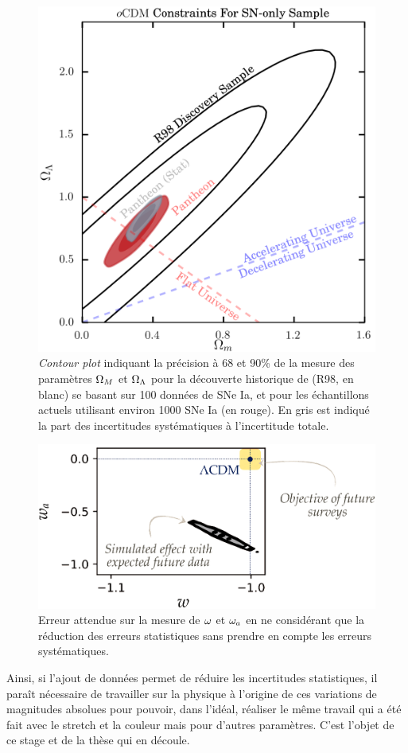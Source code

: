 \documentclass[a4paper, 12pt, svgnames]{article}
\begin{document}
\begin{figure}[htbp!]
    \centering
    \includegraphics[width=.5\linewidth]{Rapport_figures/scolnic_syst.png}
    \captionsetup{justification=centering}
    \caption{\textit{Contour plot} indiquant la précision à 68 et 90\% de la
    mesure des paramètres $\Omega_M$ et $\Omega_\Lambda$ pour la découverte historique de
     (R98, en blanc) se basant sur 100 données de SNe Ia, et
    pour les échantillons actuels utilisant environ 1000 SNe Ia (en rouge). En
    gris est indiqué la part des incertitudes systématiques à l'incertitude
    totale. \cite{scolnic_complete_2018}}
    \label{scolnic_syst}
\end{figure}

\begin{figure}[htbp!]
    \centering
    \includegraphics[width=.5\linewidth]{Rapport_figures/error.PNG}
    \captionsetup{justification=centering}
    \caption{Erreur attendue sur la mesure de $\omega$ et $\omega_a$ en ne considérant
    que la réduction des erreurs statistiques sans prendre en compte les erreurs
    systématiques.}
    \label{err_syst}
\end{figure}

Ainsi, si l'ajout de données permet de réduire
les incertitudes statistiques, il paraît nécessaire de travailler sur la
physique à l'origine de ces variations de magnitudes absolues pour pouvoir, dans
l'idéal, réaliser le même travail qui a été fait avec le stretch et la couleur
mais pour d'autres paramètres. C'est l'objet de ce stage et de la thèse qui en
découle.
\end{document}
